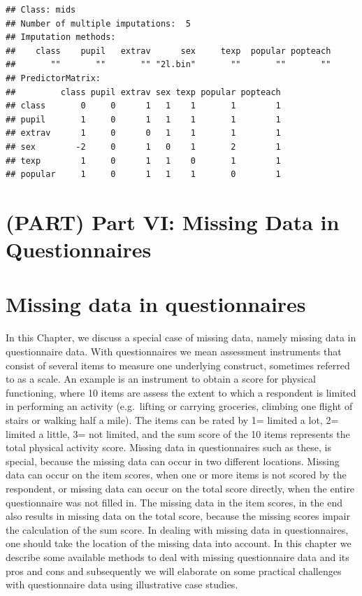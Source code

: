 \documentclass[
]{book}
\begin{document}
\begin{verbatim}
## Class: mids
## Number of multiple imputations:  5 
## Imputation methods:
##    class    pupil   extrav      sex     texp  popular popteach 
##       ""       ""       "" "2l.bin"       ""       ""       "" 
## PredictorMatrix:
##         class pupil extrav sex texp popular popteach
## class       0     0      1   1    1       1        1
## pupil       1     0      1   1    1       1        1
## extrav      1     0      0   1    1       1        1
## sex        -2     0      1   0    1       2        1
## texp        1     0      1   1    0       1        1
## popular     1     0      1   1    1       0        1
\end{verbatim}

\hypertarget{part-part-vi-missing-data-in-questionnaires}{%
\chapter*{(PART) Part VI: Missing Data in
Questionnaires}\label{part-part-vi-missing-data-in-questionnaires}}

\hypertarget{missing-data-in-questionnaires}{%
\chapter{Missing data in
questionnaires}\label{missing-data-in-questionnaires}}

In this Chapter, we discuss a special case of missing data, namely
missing data in questionnaire data. With questionnaires we mean
assessment instruments that consist of several items to measure one
underlying construct, sometimes referred to as a scale. An example is an
instrument to obtain a score for physical functioning, where 10 items
are assess the extent to which a respondent is limited in performing an
activity (e.g.~lifting or carrying groceries, climbing one flight of
stairs or walking half a mile). The items can be rated by 1= limited a
lot, 2= limited a little, 3= not limited, and the sum score of the 10
items represents the total physical activity score. Missing data in
questionnaires such as these, is special, because the missing data can
occur in two different locations. Missing data can occur on the item
scores, when one or more items is not scored by the respondent, or
missing data can occur on the total score directly, when the entire
questionnaire was not filled in. The missing data in the item scores, in
the end also results in missing data on the total score, because the
missing scores impair the calculation of the sum score. In dealing with
missing data in questionnaires, one should take the location of the
missing data into account. In this chapter we describe some available
methods to deal with missing questionnaire data and its pros and cons
and subsequently we will elaborate on some practical challenges with
questionnaire data using illustrative case studies.
\end{document}
